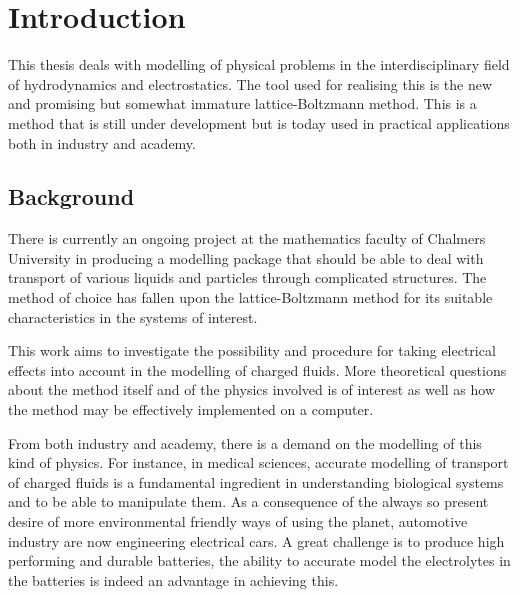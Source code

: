 \section{Introduction}
This thesis deals with modelling of physical problems in the
interdisciplinary field of hydrodynamics and electrostatics. The tool
used for realising this is the new and promising but somewhat immature
lattice-Boltzmann method. This is a method that is still under
development but is today used in practical applications both in
industry and academy.

\subsection{Background}

There is currently an ongoing project at the mathematics faculty of
Chalmers University in producing a modelling package that
should be able to deal with transport of various liquids and particles
through complicated structures. The method of choice has fallen upon
the lattice-Boltzmann method for its suitable characteristics in the
systems of interest. 

This work aims to investigate the possibility and procedure for taking
electrical effects into account in the modelling of charged
fluids. More theoretical questions about the method itself and of the
physics involved is of interest as well as how the method may be
effectively implemented on a computer.

From both industry and academy, there is a demand on the modelling of
this kind of physics. For instance, in medical sciences, accurate
modelling of transport of charged fluids is a fundamental ingredient
in understanding biological systems and to be able to manipulate
them. As a consequence of the always so present desire of more
environmental friendly ways of using the planet, automotive industry
are now engineering electrical cars. A great challenge is to produce
high performing and durable batteries, the ability to accurate
model the electrolytes in the batteries is indeed an advantage in
achieving this. 

